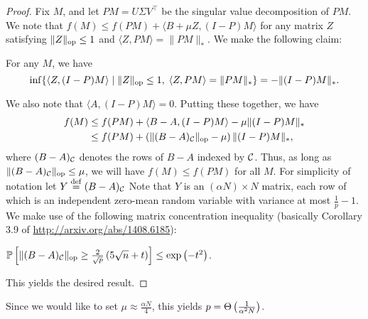 \documentclass[11pt]{article}
\begin{document}
\begin{proof}
Fix $M$, and let $PM = U\Sigma V^{\top}$ be the singular value 
decomposition of $PM$. We note that 
$f(M) \leq f(PM) + \langle B + \mu Z, (I-P)M \rangle$ for 
any matrix $Z$ satisfying $\|Z\|_{\mathrm{op}} \leq 1$ and $\langle Z, PM \rangle = \|PM\|_*$.
We make the following claim:
\begin{lemma}
For any $M$, we have
\[ \inf\{ \langle Z, (I-P)M \rangle \mid \|Z\|_{\mathrm{op}} \leq 1,\; \langle Z, PM \rangle = \|PM\|_*\} = -\|(I-P)M\|_*. \]
\end{lemma}
We also note that $\langle A, (I-P)M \rangle = 0$. Putting these together, we have
\begin{align}
f(M) &\leq f(PM) + \langle B-A, (I-P)M \rangle - \mu \|(I-P)M\|_* \\
 &\leq f(PM) + \left(\|(B-A)_{\mathcal{C}}\|_{\mathrm{op}} - \mu\right) \|(I-P)M\|_*,
\end{align}
where $(B-A)_{\mathcal{C}}$ denotes the rows of $B-A$ indexed by $\mathcal{C}$.
Thus, as long as $\|(B-A)_{\mathcal{C}}\|_{\mathrm{op}} \leq \mu$, we will have $f(M) \leq f(PM)$ for all $M$.
For simplicity of notation let $Y \stackrel{\mathrm{def}}{=} (B-A)_{\mathcal{C}}$ Note that $Y$ is an $(\alpha N) \times N$ 
matrix, each row of which is an independent zero-mean random variable with variance at most $\frac{1}{p}-1$. 
We make use of the following matrix concentration inequality (basically Corollary 3.9 of \url{http://arxiv.org/abs/1408.6185}):
\begin{theorem}
$\mathbb{P}\left[\|(B-A)_{\mathcal{C}}\|_{\mathrm{op}} \geq \frac{2}{\sqrt{p}}\left(5\sqrt{n} + t\right)\right] \leq \exp\left(-t^2\right)$.
\end{theorem}
This yields the desired result.
\end{proof}
Since we would like to set $\mu \approx \frac{\alpha N}{4}$, this yields $p = \Theta\left(\frac{1}{\alpha^2N}\right)$.
\end{document}
